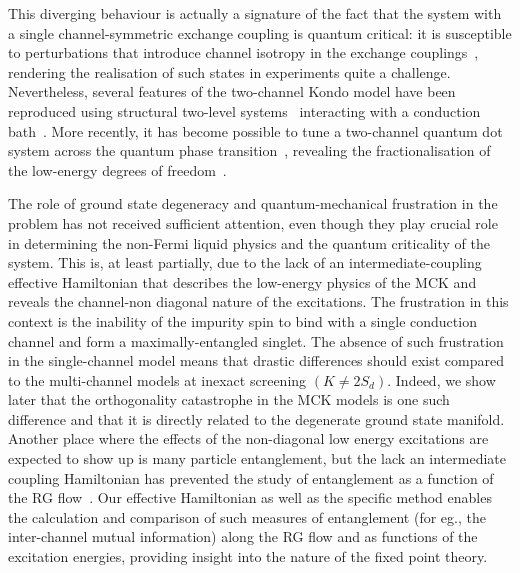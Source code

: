 \documentclass[reprint,prb,superscriptaddress]{revtex4-2}
\begin{document}
{This diverging behaviour is actually a signature of the fact that the system with a single channel-symmetric exchange coupling is quantum critical: it is susceptible to perturbations that introduce channel isotropy in the exchange couplings~\cite{Noz_blandin_1980,andrei_jerez_1995,affleck_pang_cox_1992,zarand_2000,zheng_2021}, rendering the realisation of such states in experiments quite a challenge.
Nevertheless, several features of the two-channel Kondo model have been reproduced using structural two-level systems~\cite{zawadowski_1980,vladar_1983} interacting with a conduction bath~\cite{cichorek_2005,ralph_buhrman_1992,ralph_ludwig_1994,Iftikhar2015,Zhu2016}.
More recently, it has become possible to tune a two-channel quantum dot system across the quantum phase transition~\cite{Potok2007,Keller2015}, revealing the fractionalisation of the low-energy degrees of freedom~\cite{emery1995,Coleman_tsvelik,mebrahtu_2013}.

The role of ground state degeneracy and quantum-mechanical frustration in the problem has not received sufficient attention, even though they play crucial role in determining the non-Fermi liquid physics and the quantum criticality of the system.
This is, at least partially, due to the lack of an intermediate-coupling effective Hamiltonian that describes the low-energy physics of the MCK and reveals the channel-non diagonal nature of the excitations.
The frustration in this context is the inability of the impurity spin to bind with a single conduction channel and form a maximally-entangled singlet.
The absence of such frustration in the single-channel model means that drastic differences should exist compared to the multi-channel models at inexact screening \((K \neq 2S_d)\).
Indeed, we show later that the orthogonality catastrophe in the MCK models is one such difference and that it is directly related to the degenerate ground state manifold.
Another place where the effects of the non-diagonal low energy excitations are expected to show up is many particle entanglement, but the lack an intermediate coupling Hamiltonian has prevented the study of entanglement as a function of the RG flow~\cite{alkurtass_affleck_2016,kim_shim_2021}. Our effective Hamiltonian as well as the specific method enables the calculation and comparison of such measures of entanglement (for eg., the inter-channel mutual information) along the RG flow and as functions of the excitation energies, providing insight into the nature of the fixed point theory.
}
\end{document}
